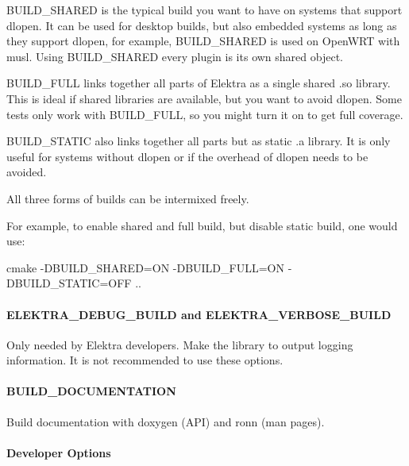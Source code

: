 {\ttfamily B\+U\+I\+L\+D\+\_\+\+S\+H\+A\+R\+ED} is the typical build you want to have on systems that support {\ttfamily dlopen}. It can be used for desktop builds, but also embedded systems as long as they support {\ttfamily dlopen}, for example, {\ttfamily B\+U\+I\+L\+D\+\_\+\+S\+H\+A\+R\+ED} is used on Open\+W\+RT with musl. Using {\ttfamily B\+U\+I\+L\+D\+\_\+\+S\+H\+A\+R\+ED} every plugin is its own shared object.

{\ttfamily B\+U\+I\+L\+D\+\_\+\+F\+U\+LL} links together all parts of Elektra as a single shared {\ttfamily .so} library. This is ideal if shared libraries are available, but you want to avoid {\ttfamily dlopen}. Some tests only work with {\ttfamily B\+U\+I\+L\+D\+\_\+\+F\+U\+LL}, so you might turn it on to get full coverage.

{\ttfamily B\+U\+I\+L\+D\+\_\+\+S\+T\+A\+T\+IC} also links together all parts but as static {\ttfamily .a} library. It is only useful for systems without {\ttfamily dlopen} or if the overhead of {\ttfamily dlopen} needs to be avoided.

All three forms of builds can be intermixed freely.

For example, to enable shared and full build, but disable static build, one would use\+: \begin{DoxyVerb}cmake -DBUILD_SHARED=ON -DBUILD_FULL=ON -DBUILD_STATIC=OFF ..
\end{DoxyVerb}


\paragraph*{E\+L\+E\+K\+T\+R\+A\+\_\+\+D\+E\+B\+U\+G\+\_\+\+B\+U\+I\+LD and E\+L\+E\+K\+T\+R\+A\+\_\+\+V\+E\+R\+B\+O\+S\+E\+\_\+\+B\+U\+I\+LD}

Only needed by Elektra developers. Make the library to output logging information. It is not recommended to use these options.

\paragraph*{B\+U\+I\+L\+D\+\_\+\+D\+O\+C\+U\+M\+E\+N\+T\+A\+T\+I\+ON}

Build documentation with doxygen (A\+PI) and ronn (man pages).

\paragraph*{Developer Options}

